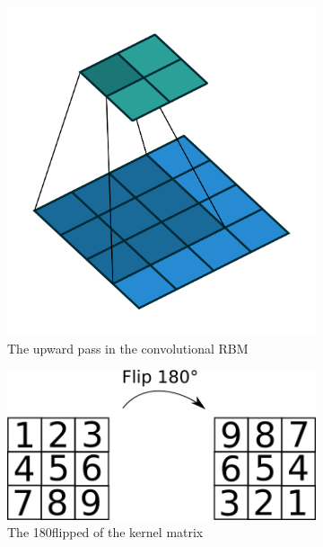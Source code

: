 \begin{figure}
	\centering
	\begin{subfigure}[t]{.30\textwidth}
  		\centering
  		\includegraphics[width=.8\linewidth]{imgs/crbm_padding1.png}
  		\caption{The upward pass in the convolutional RBM}
  		\label{fig:convrbmsub1}
	\end{subfigure}%
	\begin{subfigure}[t]{.30\textwidth}
  		\centering
  		\includegraphics[width=.8\linewidth]{imgs/kernel_flip.png}
  		\caption{The 180\textdegree  flipped of the kernel matrix}
  		\label{fig:convrbmsub2}
	\end{subfigure}
	\begin{subfigure}[t]{.30\textwidth}
  		\centering

\end{subfigure}
\end{figure}
